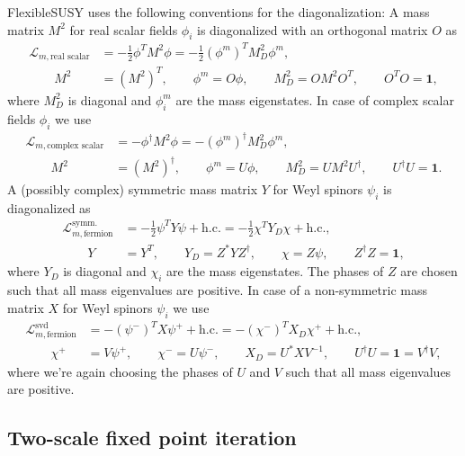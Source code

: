 \documentclass[final,3p,11pt,pdflatex]{elsarticle}
\makeatletter
\newcommand{\fs}{FlexibleSUSY\@\xspace}
\newcommand{\Lagr}{\mathcal{L}}
\newcommand{\unity}{\mathbf{1}}
\makeatother
\begin{document}
\fs uses the following conventions for the diagonalization: A mass
matrix $M^2$ for real scalar fields $\phi_i$ is diagonalized with an
orthogonal matrix $O$ as
%
\begin{align}
  \Lagr_{m,\text{real scalar}}
  &= - \frac{1}{2} \phi^T M^2 \phi
  = - \frac{1}{2} (\phi^m)^T M^2_D \phi^m, \\
  \qquad M^2 &= (M^2)^T ,
  \qquad \phi^m = O \phi ,
  \qquad M^2_D = O M^2 O^T ,
  \qquad O^T O = \unity ,
\end{align}
%
where $M^2_D$ is diagonal and $\phi^m_i$ are the mass eigenstates.  In
case of complex scalar fields $\phi_i$ we use
%
\begin{align}
  \Lagr_{m,\text{complex scalar}}
  &= - \phi^\dagger M^2 \phi
  = - (\phi^m)^\dagger M^2_D \phi^m, \\
  \qquad M^2 &= (M^2)^\dagger ,
  \qquad \phi^m = U \phi ,
  \qquad M^2_D = U M^2 U^\dagger ,
  \qquad U^\dagger U = \unity .
\end{align}
%
A (possibly complex) symmetric mass matrix $Y$ for Weyl spinors
$\psi_i$ is diagonalized as
%
\begin{align}
  \Lagr_{m,\text{fermion}}^\text{symm.}
  &= - \frac{1}{2} \psi^T Y \psi + \text{h.c.}
  = - \frac{1}{2} \chi^T Y_D \chi + \text{h.c.}, \\
  \qquad Y &= Y^T ,
  \qquad Y_D = Z^* Y Z^\dagger ,
  \qquad \chi = Z \psi ,
  \qquad Z^\dagger Z = \unity ,
\end{align}
%
where $Y_D$ is diagonal and $\chi_i$ are the mass eigenstates.  The
phases of $Z$ are chosen such that all mass eigenvalues are positive.
In case of a non-symmetric mass matrix $X$ for Weyl spinors $\psi_i$
we use
%
\begin{align}
  \Lagr_{m,\text{fermion}}^\text{svd}
  &= - (\psi^-)^T X \psi^+ + \text{h.c.}
  = - (\chi^-)^T X_D \chi^+ + \text{h.c.}, \\
  \qquad \chi^+ &= V \psi^+ ,
  \qquad \chi^- = U \psi^- ,
  \qquad X_D = U^* X V^{-1} ,
  \qquad U^\dagger U = \unity = V^\dagger V ,
\end{align}
%
where we're again choosing the phases of $U$ and $V$ such that all mass
eigenvalues are positive.

\subsection{Two-scale fixed point iteration}
\label{sec:TwoScaleFixedPointIteration}
\end{document}
